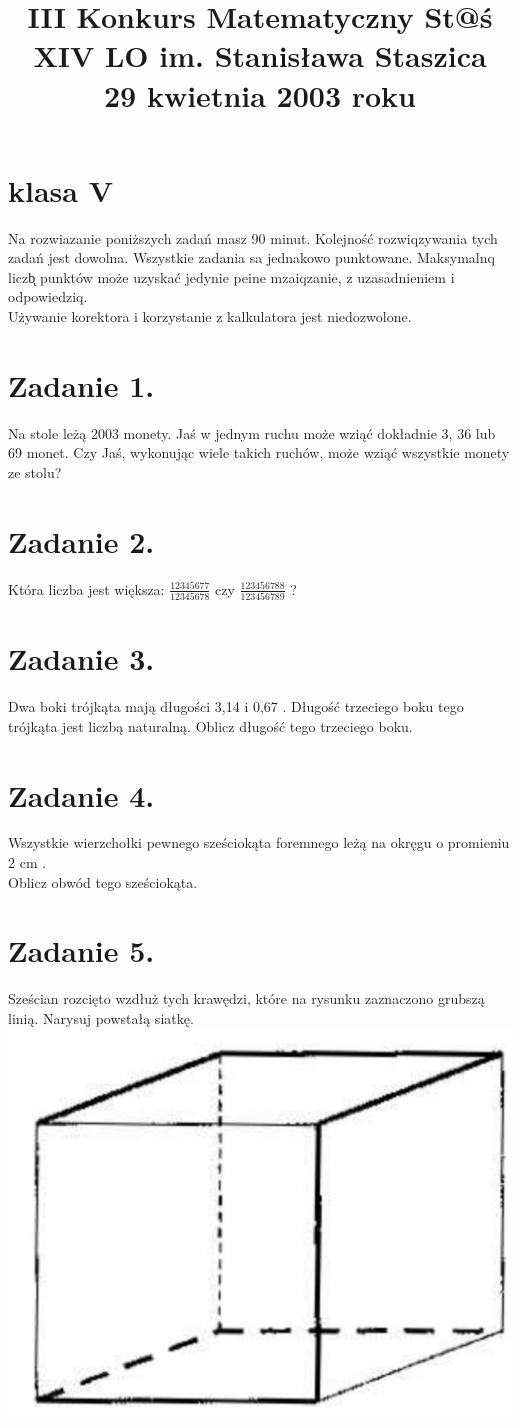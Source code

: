 \documentclass[10pt]{article}
\title{III Konkurs Matematyczny St@ś \\
 XIV LO im. Stanisława Staszica \\
 29 kwietnia 2003 roku }
\author{}
\date{}
\begin{document}
\maketitle
\section*{klasa V}
Na rozwiazanie poniższych zadań masz 90 minut. Kolejność rozwiqzywania tych zadań jest dowolna. Wszystkie zadania sa jednakowo punktowane. Maksymalnq liczb̨ punktów może uzyskać jedynie peine mzaiqzanie, z uzasadnieniem i odpowiedziq.\\
Używanie korektora i korzystanie z kalkulatora jest niedozwolone.

\section*{Zadanie 1.}
Na stole leżą 2003 monety. Jaś w jednym ruchu może wziąć dokładnie 3, 36 lub 69 monet. Czy Jaś, wykonując wiele takich ruchów, może wziąć wszystkie monety ze stolu?

\section*{Zadanie 2.}
Która liczba jest większa: \(\frac{12345677}{12345678}\) czy \(\frac{123456788}{123456789}\) ?

\section*{Zadanie 3.}
Dwa boki trójkąta mają długości 3,14 i 0,67 . Długość trzeciego boku tego trójkąta jest liczbą naturalną. Oblicz długość tego trzeciego boku.

\section*{Zadanie 4.}
Wszystkie wierzchołki pewnego sześciokąta foremnego leżą na okręgu o promieniu 2 cm .\\
Oblicz obwód tego sześciokąta.

\section*{Zadanie 5.}
Sześcian rozcięto wzdłuż tych krawędzi, które na rysunku zaznaczono grubszą linią. Narysuj powstałą siatkę.\\
\includegraphics[max width=\textwidth, center]{2024_11_21_a8e98f1bc496eab22bc6g-1}
\end{document}
